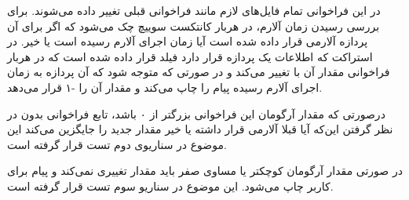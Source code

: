در این فراخوانی تمام فایل‌های لازم مانند فراخوانی قبلی تغییر داده می‌شوند. برای بررسی رسیدن زمان آلارم، در هربار کانتکست سوییچ چک می‌شود که اگر برای آن پردازه آلارمی قرار داده شده است آیا زمان اجرای آلارم رسیده است یا خیر. در استراکت 
 که اطلاعات یک پردازه قرار دارد فیلد 
 قرار داده شده است که در هربار فراخوانی 
 مقدار آن با 
  تغییر می‌کند و در صورتی که 
   متوجه شود که آن پردازه به زمان اجرای آلارم رسیده پیام را چاپ می‌کند و مقدار آن را -۱ قرار می‌دهد.

\vspace{\baselineskip}

درصورتی که مقدار آرگومان این فراخوانی بزرگتر از ۰ باشد، تابع فراخوانی بدون در نظر گرفتن این‌که آیا قبلا آلارمی قرار داشته یا خیر مقدار جدید را جایگزین می‌کند این موضوع در سناریوی دوم تست قرار گرفته است.
\vspace{\baselineskip}

در صورتی مقدار آرگومان کوچکتر یا مساوی صفر باید مقدار 
 تغییری نمی‌کند و پیام برای کاربر چاپ می‌شود. این موضوع در سناریو سوم تست قرار گرفته است.
